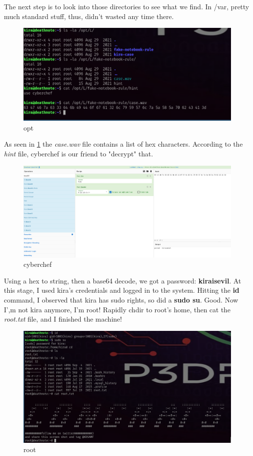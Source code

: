 \documentclass[a4paper,12pt]{article}
\begin{document}
The next step is to look into those directories to see what we find.
In /var, pretty much standard stuff, thus, didn't wasted any time there.
\begin{figure}[ht!]
	\includegraphics[width=\linewidth]{img/opt_00.png}
	\caption{opt}
	\label{fig:opt}
\end{figure}
As seen in \ref{fig:opt} the \textit{case.wav} file contains a list of hex characters. According to the \textit{hint} file, cyberchef is our friend to "decrypt" that.

\begin{figure}[ht!]
	\includegraphics[width=\linewidth]{img/cyberchef.png}
	\caption{cyberchef}
	\label{fig:cyberchef}
\end{figure}

Using a hex to string, then a base64 decode, we got a password: \textbf{kiraisevil}.
At this stage, I used kira's credentials and logged in to the system.
Hitting the \textbf{id} command, I observed that kira has sudo rights, so did a \textbf{sudo su}.
Good. Now I',m not kira anymore, I'm root!
Rapidly chdir to root's home, then cat the \textit{root.txt} file, and I finished the machine!

\begin{figure}[ht!]
	\includegraphics[width=\linewidth]{img/root.png}
	\caption{root}
	\label{fig:root}
\end{figure}
\end{document}
